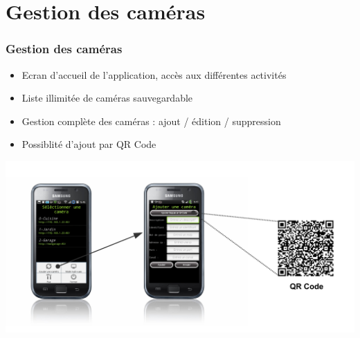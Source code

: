 
\section{Gestion des caméras}
  \begin{frame}
   \frametitle{Gestion des caméras}

  \centering
  \begin{minipage}{0.95\textwidth}
     \begin{itemize}
    \item Ecran d'accueil de l'application, accès aux différentes activités
    \item Liste illimitée de caméras sauvegardable
    \item Gestion complète des caméras : ajout / édition / suppression
    \item Possiblité d'ajout par QR Code
   \end{itemize}
   \end{minipage}
   
     \includegraphics[scale=0.46]{Images/ImageSlide5.pdf}
   
  \end{frame}
